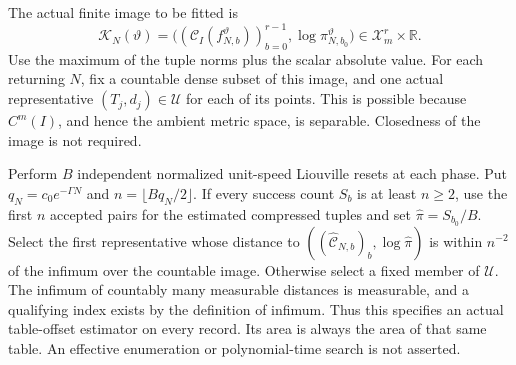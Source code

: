 The actual finite image to be fitted is
\begin{equation}\label{eq:v74-image}
 \mathcal K_N(\vartheta)=
  \bigl((\mathcal C_I(f_{N,b}^{\vartheta}))_{b=0}^{r-1},
                             \log\pi_{N,b_0}^{\vartheta}\bigr)
                    \in\mathcal X_m^r\times\mathbb R.
\end{equation}
Use the maximum of the tuple norms plus the scalar absolute value.
For each returning $N$, fix a countable dense subset of this image,
and one actual representative $(T_j,d_j)\in\mathscr U$ for each
of its points.  This is possible because $C^m(I)$, and hence the
ambient metric space, is separable.  Closedness of the image is not
required.

Perform $B$ independent normalized unit-speed Liouville resets at each
phase.  Put $q_N=c_0e^{-\Gamma N}$ and $n=\lfloor Bq_N/2\rfloor$.
If every success count $S_b$ is at least $n\ge2$, use the first $n$
accepted pairs for the estimated compressed tuples and set
$\widehat\pi=S_{b_0}/B$.  Select the first representative whose
distance to
$((\widehat{\mathcal C}_{N,b})_b,\log\widehat\pi)$ is within
$n^{-2}$ of the infimum over the countable image.  Otherwise select a
fixed member of $\mathscr U$.  The infimum of countably many
measurable distances is measurable, and a qualifying index exists by
the definition of infimum.  Thus this specifies an actual table-offset
estimator on every record.  Its area is always the area of that same
table.  An effective enumeration or polynomial-time search is not
asserted.

